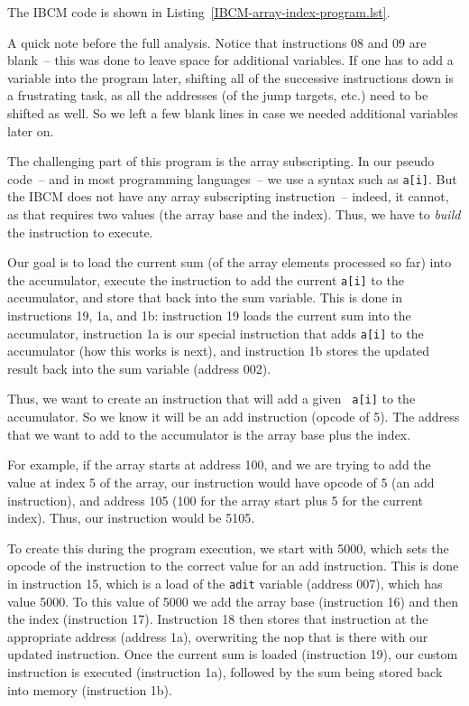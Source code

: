 The IBCM code is shown in Listing~\ref{IBCM-array-index-program.lst}.

\begin{figure}[h!]

\end{figure}

A quick note before the full analysis.  Notice that instructions 08
and 09 are blank~-- this was done to leave space for additional
variables.  If one has to add a variable into the program later,
shifting all of the successive instructions down is a frustrating
task, as all the addresses (of the jump targets, etc.)  need to be
shifted as well. So we left a few blank lines in case we needed
additional variables later on.

The challenging part of this program is the array subscripting.  In
our pseudo code~-- and in most programming languages~-- we use a syntax
such as {\tt a[i]}.  But the IBCM does not have any array subscripting
instruction~-- indeed, it cannot, as that requires two values (the
array base and the index). Thus, we have to {\em build} the
instruction to execute.

Our goal is to load the current sum (of the array elements processed
so far) into the accumulator, execute the instruction to add the
current {\tt a[i]} to the accumulator, and store that back into the
sum variable.  This is done in instructions 19, 1a, and 1b:
instruction 19 loads the current sum into the accumulator, instruction
1a is our special instruction that adds {\tt a[i]} to the accumulator
(how this works is next), and instruction 1b stores the updated result
back into the sum variable (address 002).

Thus, we want to create an instruction that will add a given {\tt
  a[i]} to the accumulator.  So we know it will be an add instruction
(opcode of 5).  The address that we want to add to the accumulator is
the array base plus the index.

For example, if the array starts at address 100, and we are trying to
add the value at index 5 of the array, our instruction would have
opcode of 5 (an add instruction), and address 105 (100 for the array
start plus 5 for the current index).  Thus, our instruction would be
5105.

To create this during the program execution, we start with 5000, which
sets the opcode of the instruction to the correct value for an add
instruction.  This is done in instruction 15, which is a load of the
{\tt adit} variable (address 007), which has value 5000.  To this
value of 5000 we add the array base (instruction 16) and then the
index (instruction 17).  Instruction 18 then stores that instruction
at the appropriate address (address 1a), overwriting the nop that is
there with our updated instruction.  Once the current sum is loaded
(instruction 19), our custom instruction is executed (instruction 1a),
followed by the sum being stored back into memory (instruction 1b).


